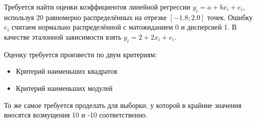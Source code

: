 Требуется найти оценки коэффициентов линейной регрессии $y_i = a + bx_i + e_i$, используя 20 равномерно распределённых на отрезке $[-1.8; 2.0]$ точек. Ошибку $e_i$ считаем нормально распределённой с матожиданием 0 и дисперсией 1. В качестве эталонной зависимости взять $y_i = 2 + 2x_i + e_i$.

Оценку требуется произвести по двум критериям:
\begin{itemize}
	\item Критерий наименьших квадратов
	\item Критерий наименьших модулей
\end{itemize}

То же самое требуется проделать для выборки, у которой в крайние значения вносятся возмущения 10 и -10 соответственно.